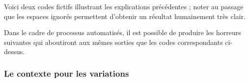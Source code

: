 Voici deux codes fictifs illustrant les explications précédentes ; noter au passage que les espaces ignorés permettent d'obtenir un résultat humainement très clair.
\begin{multicols}{2}

\end{multicols}

Dans le cadre de processus automatisés, il est possible de produire les horreurs suivantes qui aboutiront aux mêmes sorties que les codes correspondants ci-dessus.
\begin{multicols}{2}

\end{multicols}



\subsubsection{Le contexte  pour les variations}

